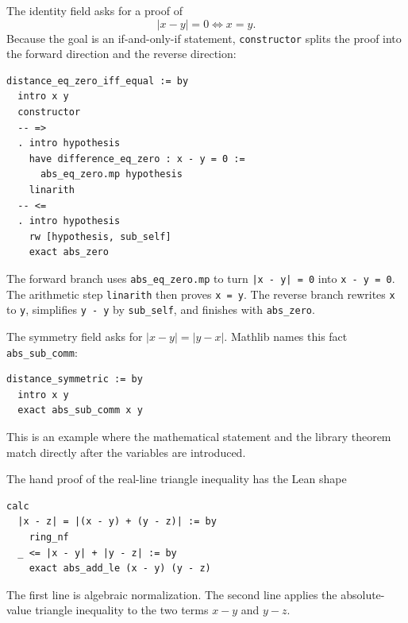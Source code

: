 \begin{example*}
The identity field asks for a proof of
\[
  |x-y|=0\iff x=y.
\]
Because the goal is an if-and-only-if statement, \texttt{constructor} splits
the proof into the forward direction and the reverse direction:
\begin{verbatim}
distance_eq_zero_iff_equal := by
  intro x y
  constructor
  -- =>
  . intro hypothesis
    have difference_eq_zero : x - y = 0 :=
      abs_eq_zero.mp hypothesis
    linarith
  -- <=
  . intro hypothesis
    rw [hypothesis, sub_self]
    exact abs_zero
\end{verbatim}
The forward branch uses \texttt{abs\_eq\_zero.mp} to turn
\texttt{|x - y| = 0} into \texttt{x - y = 0}. The arithmetic step
\texttt{linarith} then proves \texttt{x = y}. The reverse branch rewrites
\texttt{x} to \texttt{y}, simplifies \texttt{y - y} by \texttt{sub\_self},
and finishes with \texttt{abs\_zero}.
\end{example*}

\begin{example*}[Symmetry]
The symmetry field asks for \( |x-y|=|y-x| \). Mathlib names this fact
\texttt{abs\_sub\_comm}:
\begin{verbatim}
distance_symmetric := by
  intro x y
  exact abs_sub_comm x y
\end{verbatim}
This is an example where the mathematical statement and the library theorem
match directly after the variables are introduced.
\end{example*}

\begin{example*}
The hand proof of the real-line triangle inequality has the Lean shape
\begin{verbatim}
calc
  |x - z| = |(x - y) + (y - z)| := by
    ring_nf
  _ <= |x - y| + |y - z| := by
    exact abs_add_le (x - y) (y - z)
\end{verbatim}
The first line is algebraic normalization. The second line applies the
absolute-value triangle inequality to the two terms \(x-y\) and \(y-z\).
\end{example*}


